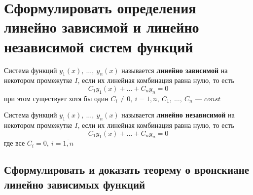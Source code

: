 \newpage
\section{Сформулировать определения линейно зависимой и линейно независимой систем функций}

\begin{definition}
    Система функций $y_1(x),\ \ldots,\ y_n(x)$ называется \textbf{линейно зависимой} на некотором промежутке $I$, если их линейная комбинация равна нулю, то есть 
    \[
        C_1y_1(x) + \ldots + C_n y_n = 0
    \]
    при этом существует хотя бы один $C_i \ne 0,\ i = \overline{1,n},\ C_1,\ \ldots,\ C_n$ --- $const$
\end{definition}

\begin{definition}
    Система функций $y_1(x),\ \ldots,\ y_n(x)$ называется \textbf{линейно независимой} на некотором промежутке $I$, если их линейная комбинация равна нулю, то есть 
    \[
        C_1y_1(x) + \ldots + C_n y_n = 0
    \]
    где все $C_i = 0,\ i = \overline{1,n}$
\end{definition}

\subsection{Сформулировать и доказать теорему о вронскиане линейно зависимых функций}

